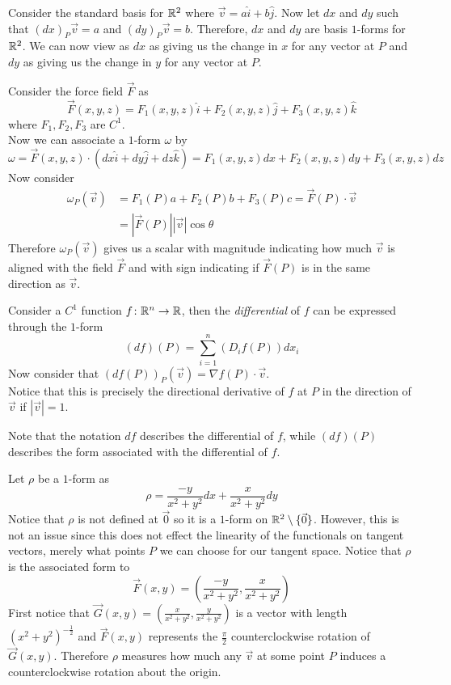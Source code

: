 \documentclass[notes]{subfiles}
\begin{document}
\begin{example}
    Consider the standard basis for $\mathbb{R}^2$ where $\vec{v} = a\hat{i} + b\hat{j}$. Now let $dx$ and $dy$ such that $(dx)_P\vec{v} = a$ and $(dy)_P\vec{v} = b$. Therefore, $dx$ and $dy$ are basis $1$-forms for $\mathbb{R}^2$. We can now view as $dx$ as giving us the change in $x$ for any vector at $P$ and $dy$ as giving us the change in $y$ for any vector at $P$.
\end{example}

\begin{example}
    Consider the force field $\vec{F}$ as
    \[
        \vec{F}(x, y, z) = F_1(x, y, z)\hat{i} + F_2(x, y, z)\hat{j} + F_3(x, y, z)\hat{k}
    \]
    where $F_1, F_2, F_3$ are $C^1$. \\
    Now we can associate a $1$-form $\omega$ by
    \[
        \omega = \vec{F}(x, y, z)\cdot(dx\hat{i} + dy\hat{j} + dz\hat{k}) = F_1(x, y, z)dx + F_2(x, y, z)dy + F_3(x, y, z)dz
    \]
    Now consider
    \begin{align*}
        \omega_P(\vec{v})
        &= F_1(P)a + F_2(P)b + F_3(P)c
        = \vec{F}(P)\cdot\vec{v} \\
        &= |\vec{F}(P)||\vec{v}|\cos\theta
    \end{align*}
    Therefore $\omega_P(\vec{v})$ gives us a scalar with magnitude indicating how much $\vec{v}$ is aligned with the field $\vec{F}$ and with sign indicating if $\vec{F}(P)$ is in the same direction as $\vec{v}$.
\end{example}

\begin{definition}[Differential]
    Consider a $C^1$ function $f\colon \mathbb{R}^n \to \mathbb{R}$, then the \textit{differential} of $f$ can be expressed through the $1$-form
    \[
        (df)(P) = \sum_{i = 1}^n (D_i f(P)) dx_i
    \]
    Now consider that $(df(P))_P(\vec{v}) = \nabla f(P)\cdot \vec{v}$. \\
    Notice that this is precisely the directional derivative of $f$ at $P$ in the direction of $\vec{v}$ if $|\vec{v}| = 1$.
\end{definition}

Note that the notation $df$ describes the differential of $f$, while $(df)(P)$ describes the form associated with the differential of $f$.

\begin{example}
    Let $\rho$ be a $1$-form as
    \[
        \rho = \frac{-y}{x^2 + y^2}dx + \frac{x}{x^2 + y^2}dy
    \]
    Notice that $\rho$ is not defined at $\vec{0}$ so it is a $1$-form on $\mathbb{R}^2 \setminus \{ \vec{0} \}$. However, this is not an issue since this does not effect the linearity of the functionals on tangent vectors, merely what points $P$ we can choose for our tangent space. Notice that $\rho$ is the associated form to
    \[
        \vec{F}(x, y) = \left( \frac{-y}{x^2 + y^2}, \frac{x}{x^2 + y^2} \right)
    \]
    First notice that $\vec{G}(x, y) =\left( \frac{x}{x^2 + y^2}, \frac{y}{x^2 + y^2} \right)$ is a vector with length $(x^2 + y^2)^{-\frac{1}{2}}$ and $\vec{F}(x, y)$ represents the $\frac{\pi}{2}$ counterclockwise rotation of $\vec{G}(x, y)$. Therefore $\rho$ measures how much any $\vec{v}$ at some point $P$ induces a counterclockwise rotation about the origin.
\end{example}
\end{document}
